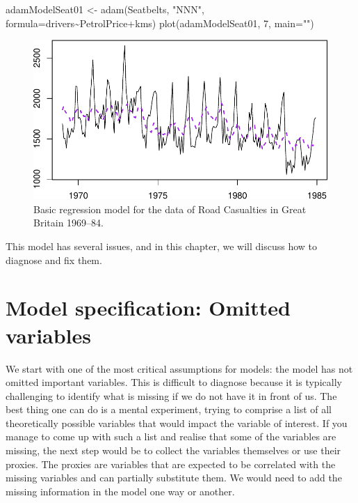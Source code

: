 \documentclass[
]{book}
\newenvironment{Shaded}{\begin{snugshade}}{\end{snugshade}}
\newcommand{\AttributeTok}[1]{\textcolor[rgb]{0.77,0.63,0.00}{#1}}
\newcommand{\DecValTok}[1]{\textcolor[rgb]{0.00,0.00,0.81}{#1}}
\newcommand{\FunctionTok}[1]{\textcolor[rgb]{0.00,0.00,0.00}{#1}}
\newcommand{\NormalTok}[1]{#1}
\newcommand{\OtherTok}[1]{\textcolor[rgb]{0.56,0.35,0.01}{#1}}
\newcommand{\SpecialCharTok}[1]{\textcolor[rgb]{0.00,0.00,0.00}{#1}}
\newcommand{\StringTok}[1]{\textcolor[rgb]{0.31,0.60,0.02}{#1}}
\theoremstyle{definition}
\theoremstyle{definition}
\theoremstyle{definition}
\theoremstyle{definition}
\theoremstyle{remark}
\begin{document}
\begin{Shaded}
\begin{Highlighting}[]
\NormalTok{adamModelSeat01 }\OtherTok{\textless{}{-}} \FunctionTok{adam}\NormalTok{(Seatbelts, }\StringTok{"NNN"}\NormalTok{,}
                        \AttributeTok{formula=}\NormalTok{drivers}\SpecialCharTok{\textasciitilde{}}\NormalTok{PetrolPrice}\SpecialCharTok{+}\NormalTok{kms)}
\FunctionTok{plot}\NormalTok{(adamModelSeat01, }\DecValTok{7}\NormalTok{, }\AttributeTok{main=}\StringTok{""}\NormalTok{)}
\end{Highlighting}
\end{Shaded}

\begin{figure}
\centering
\includegraphics{Svetunkov--2022----ADAM_files/figure-latex/adamModelSeat01-1.pdf}
\caption{\label{fig:adamModelSeat01}Basic regression model for the data of Road Casualties in Great Britain 1969--84.}
\end{figure}

This model has several issues, and in this chapter, we will discuss how to diagnose and fix them.

\hypertarget{diagnosticsOmitted}{%
\section{Model specification: Omitted variables}\label{diagnosticsOmitted}}

We start with one of the most critical assumptions for models: the model has not omitted important variables. This is difficult to diagnose because it is typically challenging to identify what is missing if we do not have it in front of us. The best thing one can do is a mental experiment, trying to comprise a list of all theoretically possible variables that would impact the variable of interest. If you manage to come up with such a list and realise that some of the variables are missing, the next step would be to collect the variables themselves or use their proxies. The proxies are variables that are expected to be correlated with the missing variables and can partially substitute them. We would need to add the missing information in the model one way or another.
\end{document}

